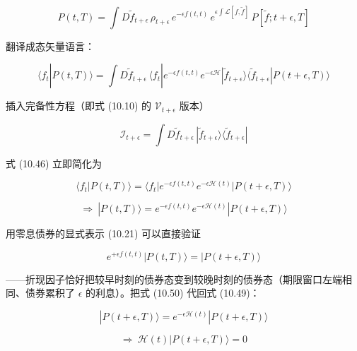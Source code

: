 \begin{equation*}
P(t,T)=\int D\tilde{f}_{t+\epsilon}\,\rho_{t+\epsilon}\,e^{-\epsilon f(t,t)}\,e^{\epsilon\int\mathcal{L}[f,\tilde{f}]}\,P[\tilde{f};t+\epsilon,T]
\tag{10.45}
\end{equation*}

翻译成态矢量语言：

\begin{equation*}
\langle f_t|P(t,T)\rangle=\int D\tilde{f}_{t+\epsilon}\,\langle f_t|e^{-\epsilon f(t,t)}e^{-\epsilon\mathcal{H}}|\tilde{f}_{t+\epsilon}\rangle\langle\tilde{f}_{t+\epsilon}|P(t+\epsilon,T)\rangle
\tag{10.46}
\end{equation*}

插入完备性方程（即式 (10.10) 的 $\mathcal{V}_{t+\epsilon}$ 版本）

\begin{equation*}
\mathcal{I}_{t+\epsilon}=\int D\tilde{f}_{t+\epsilon}\,|\tilde{f}_{t+\epsilon}\rangle\langle\tilde{f}_{t+\epsilon}|
\tag{10.47}
\end{equation*}

式 (10.46) 立即简化为

\begin{equation*}
\langle f_t|P(t,T)\rangle=\langle f_t|e^{-\epsilon f(t,t)}e^{-\epsilon\mathcal{H}(t)}|P(t+\epsilon,T)\rangle
\tag{10.48}
\end{equation*}

\begin{equation*}
\Rightarrow\ |P(t,T)\rangle=e^{-\epsilon f(t,t)}e^{-\epsilon\mathcal{H}(t)}|P(t+\epsilon,T)\rangle
\tag{10.49}
\end{equation*}

用零息债券的显式表示 (10.21) 可以直接验证

\begin{equation*}
e^{+\epsilon f(t,t)}|P(t,T)\rangle=|P(t+\epsilon,T)\rangle
\tag{10.50}
\end{equation*}

——折现因子恰好把较早时刻的债券态变到较晚时刻的债券态（期限窗口左端相同、债券累积了 $\epsilon$ 的利息）。把式 (10.50) 代回式 (10.49)：

\begin{equation*}
|P(t+\epsilon,T)\rangle=e^{-\epsilon\mathcal{H}(t)}|P(t+\epsilon,T)\rangle
\tag{10.51}
\end{equation*}

\begin{equation*}
\Rightarrow\ \mathcal{H}(t)|P(t+\epsilon,T)\rangle=0
\tag{10.52}
\end{equation*}

